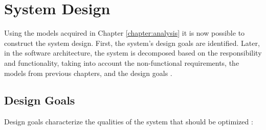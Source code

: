 
\chapter{System Design}
\label{chapter:systemdesign}
Using the models acquired in Chapter \ref{chapter:analysis} it is now possible to construct the system design. First, the system's design goals are identified. Later, in the software architecture, the system is decomposed based on the responsibility and functionality, taking into account the non-functional requirements, the models from previous chapters, and the design goals \cite{Bruegge2004}.
		
\section{Design Goals} 

Design goals characterize the qualities of the system that should be optimized \cite{Bruegge2004}:

